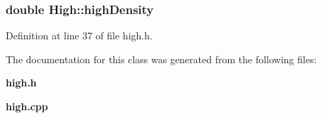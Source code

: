 \subsubsection{\setlength{\rightskip}{0pt plus 5cm}double {\bf High::high\-Density}\hspace{0.3cm}{\tt  [protected]}}\label{classHigh_p0}




Definition at line 37 of file high.h.

The documentation for this class was generated from the following files:\begin{CompactItemize}
\item 
{\bf high.h}\item 
{\bf high.cpp}\end{CompactItemize}

